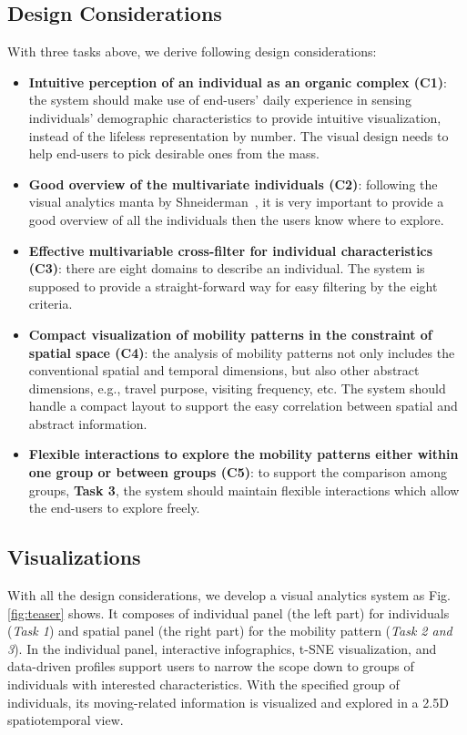 \documentclass{ieeeaccess}
\begin{document}
\subsection{Design Considerations}

With three tasks above, we derive following design considerations:

\begin{itemize}
\item \textbf{Intuitive perception of an individual as an organic complex (C1)}: the system should make use of end-users' daily experience in sensing individuals' demographic characteristics to provide intuitive visualization, instead of the lifeless representation by number. The visual design needs to help end-users to pick desirable ones from the mass.
\item \textbf{Good overview of the multivariate individuals (C2)}: following the visual analytics manta by Shneiderman~\cite{RN459}, it is very important to provide a good overview of all the individuals then the users know where to explore.
\item \textbf{Effective multivariable cross-filter for individual characteristics (C3)}: there are eight domains to describe an individual. The system is supposed to provide a straight-forward way for easy filtering by the eight criteria.
\item \textbf{Compact visualization of mobility patterns in the constraint of spatial space (C4)}: the analysis of mobility patterns not only includes the conventional spatial and temporal dimensions, but also other abstract dimensions, e.g., travel purpose, visiting frequency, etc. The system should handle a compact layout to support the easy correlation between spatial and abstract information.
\item \textbf{Flexible interactions to explore the mobility patterns either within one group or between groups (C5)}: to support the comparison among groups, \textbf{Task 3}, the system should maintain flexible interactions which allow the end-users to explore freely.
\end{itemize}


\subsection{Visualizations}
\label{subsec:vis} 

With all the design considerations, we develop a visual analytics system as Fig. \ref{fig:teaser} shows. It composes of individual panel (the left part) for individuals (\textit{Task 1}) and spatial panel (the right part) for the mobility pattern (\textit{Task 2 and 3}). In the individual panel, interactive infographics, t-SNE visualization, and data-driven profiles support users to narrow the scope down to groups of individuals with interested characteristics. With the specified group of individuals, its moving-related information is visualized and explored in a 2.5D spatiotemporal view.
\end{document}
